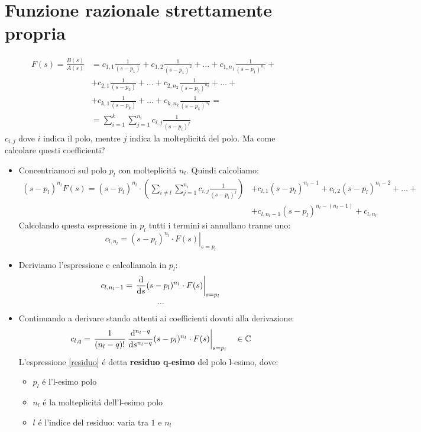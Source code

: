\documentclass[../main.tex]{subfiles}
\begin{document}
	\section{Funzione razionale strettamente propria}
	\begin{align*}
		F(s) = \frac{B(s)}{A(s)} &= c_{1,1} \frac{1}{(s-p_1)} + c_{1,2} \frac{1}{(s-p_1)^2} + \dots + c_{1,n_1} \frac{1}{(s-p_1)^{n_1}} +\\
		&+ c_{2,1} \frac{1}{(s-p_2)} + \dots + c_{2,n_2} \frac{1}{(s-p_2)^{n_2}} + \dots + \\
		&+ c_{k,1} \frac{1}{(s-p_k)} + \dots + c_{k,n_k} \frac{1}{(s-p_k)^{n_k}} =\\
		&= \sum_{i=1}^{k} \sum_{j=1}^{n_i} c_{i,j} \frac{1}{(s-p_i)^j}
	\end{align*}
	$c_{i,j}$ dove $i$ indica il polo, mentre $j$ indica la molteplicit\'{a} del polo. Ma come calcolare questi coefficienti?\\
	\begin{itemize}
		\item Concentriamoci sul polo $p_l$ con molteplicit\'{a} $n_l$. Quindi calcoliamo:
		\begin{align*}
			(s-p_l)^{n_l} F(s) = (s-p_l)^{n_l} \cdot \left( \sum_{i \neq l} \sum_{j=1}^{n_i} c_{i,j} \frac{1}{(s-p_i)^j} \right) &+ c_{l,1} (s-p_l)^{n_l -1} + c_{l,2} (s-p_l)^{n_l -2} + \dots +\\
			&+ c_{l,n_l -1} (s-p_l)^{n_l - (n_l -1)} + c_{l,n_l}
		\end{align*}
		Calcolando questa espressione in $p_l$ tutti i termini si annullano tranne uno:
		\[ c_{l,n_l} = \left. (s-p_l)^{n_l} \cdot F(s) \right|_{s=p_l} \]
		\item Deriviamo l'espressione e calcoliamola in $p_l$:
		\[ c_{l,n_l-1} = \left. \frac{\mathrm{d} }{\mathrm{d} s} (s-p_l)^{n_l} \cdot F(s) \right|_{s=p_l} \]
		\[ \dots \]
		\item Continuando a derivare stando attenti ai coefficienti dovuti alla derivazione:
		\begin{equation}
		\label{residuo}
			c_{l,q} = \left. \frac{1}{(n_l - q)!}\: \frac{\mathrm{d} {}^{n_l - q}}{\mathrm{d} s^{n_l - q}} (s-p_l)^{n_l} \cdot F(s) \right|_{s=p_l} \quad \in \mathbb{C}
		\end{equation}
		L'espressione \ref{residuo} \'{e} detta \textbf{residuo q-esimo} del polo l-esimo, dove:
		\begin{itemize}
			\item $ p_l $ \'{e} l'l-esimo polo
			\item $ n_l $ \'{e} la molteplicit\'{a} dell'l-esimo polo
			\item $ l $ \'{e} l'indice del residuo: varia tra $ 1 $ e $ n_l $
		\end{itemize}
	\end{itemize}
\end{document}
